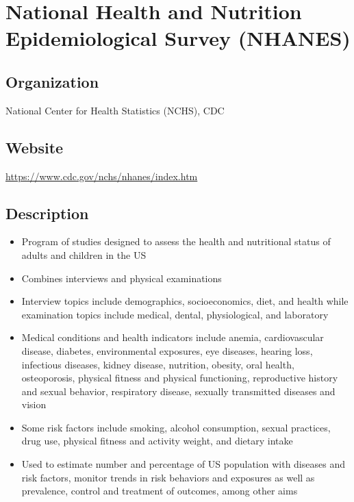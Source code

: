 \documentclass[
]{book}
\providecommand{\tightlist}{%
  \setlength{\itemsep}{0pt}\setlength{\parskip}{0pt}}
\begin{document}
\mainmatter

\hypertarget{national-health-and-nutrition-epidemiological-survey-nhanes}{%
\chapter{National Health and Nutrition Epidemiological Survey (NHANES)}\label{national-health-and-nutrition-epidemiological-survey-nhanes}}

\hypertarget{organization-49}{%
\section{Organization}\label{organization-49}}

National Center for Health Statistics (NCHS), CDC

\hypertarget{website-49}{%
\section{Website}\label{website-49}}

\url{https://www.cdc.gov/nchs/nhanes/index.htm}

\hypertarget{description-49}{%
\section{Description}\label{description-49}}

\begin{itemize}
\tightlist
\item
  Program of studies designed to assess the health and nutritional status of adults and children in the US
\item
  Combines interviews and physical examinations
\item
  Interview topics include demographics, socioeconomics, diet, and health while examination topics include medical, dental, physiological, and laboratory
\item
  Medical conditions and health indicators include anemia, cardiovascular disease, diabetes, environmental exposures, eye diseases, hearing loss, infectious diseases, kidney disease, nutrition, obesity, oral health, osteoporosis, physical fitness and physical functioning, reproductive history and sexual behavior, respiratory disease, sexually transmitted diseases and vision
\item
  Some risk factors include smoking, alcohol consumption, sexual practices, drug use, physical fitness and activity weight, and dietary intake
\item
  Used to estimate number and percentage of US population with diseases and risk factors, monitor trends in risk behaviors and exposures as well as prevalence, control and treatment of outcomes, among other aims
\end{itemize}
\end{document}
